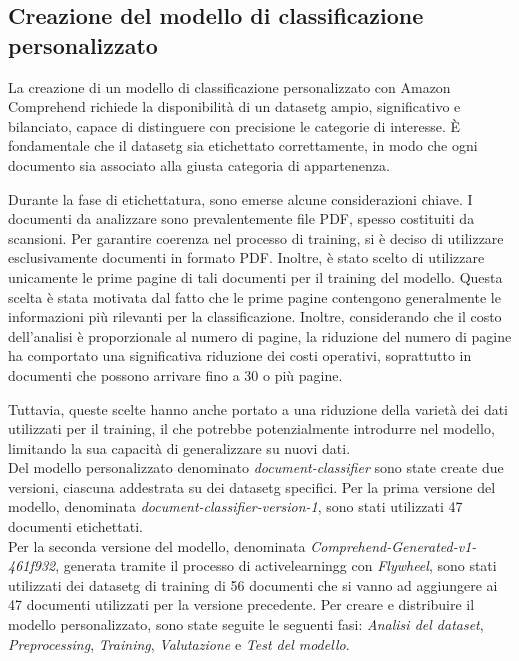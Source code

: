 \subsection{Creazione del modello di classificazione personalizzato}
\label{subsec:training-modello}
La creazione di un modello di classificazione personalizzato con Amazon Comprehend richiede la disponibilità di un \gls{datasetg} ampio, significativo e bilanciato, capace di distinguere con precisione le categorie di interesse. È fondamentale che il \gls{datasetg} sia etichettato correttamente, in modo che ogni documento sia associato alla giusta categoria di appartenenza.

Durante la fase di etichettatura, sono emerse alcune considerazioni chiave. I documenti da analizzare sono prevalentemente file PDF, spesso costituiti da scansioni. Per garantire coerenza nel processo di training, si è deciso di utilizzare esclusivamente documenti in formato PDF. Inoltre, è stato scelto di utilizzare unicamente le prime pagine di tali documenti per il training del modello. Questa scelta è stata motivata dal fatto che le prime pagine contengono generalmente le informazioni più rilevanti per la classificazione. Inoltre, considerando che il costo dell'analisi è proporzionale al numero di pagine, la riduzione del numero di pagine ha comportato una significativa riduzione dei costi operativi, soprattutto in documenti che possono arrivare fino a 30 o più pagine.

Tuttavia, queste scelte hanno anche portato a una riduzione della varietà dei dati utilizzati per il training, il che potrebbe potenzialmente introdurre  nel modello, limitando la sua capacità di generalizzare su nuovi dati. \\
Del modello personalizzato denominato \emph{document-classifier} sono state create due versioni, ciascuna addestrata su dei \gls{datasetg} specifici. 
Per la prima versione del modello, denominata \emph{document-classifier-version-1}, sono stati utilizzati 47 documenti etichettati.\\
Per la seconda versione del modello, denominata \emph{Comprehend-Generated-v1-
461f932}, generata tramite il processo di \gls{activelearningg} con \emph{Flywheel}, sono stati utilizzati dei \gls{datasetg} di training di 56 documenti che si vanno ad aggiungere ai 47 documenti utilizzati per la versione precedente.
Per creare e distribuire il modello personalizzato, sono state seguite le seguenti fasi: \emph{Analisi del dataset}, \emph{Preprocessing}, \emph{Training}, \emph{Valutazione} e \emph{Test del modello}.
